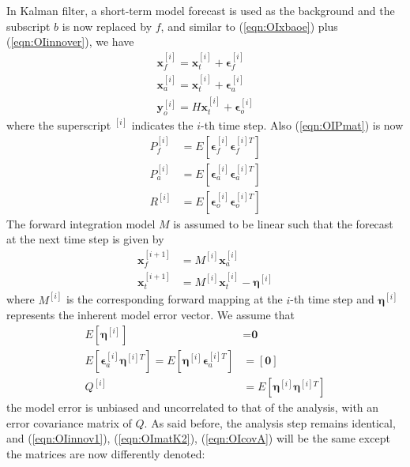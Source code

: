 In Kalman filter, a short-term model forecast is used as the background and the subscript $b$ is now replaced by $f$, and similar to (\ref{eqn:OIxbaoe}) plus (\ref{eqn:OIinnover}), we have
\begin{subequations}
\begin{align}
\textbf{x}_f^{[i]} = \textbf{x}_t^{[i]} + \bm{\epsilon}_f^{[i]} \\
\textbf{x}_a^{[i]} = \textbf{x}_t^{[i]} + \bm{\epsilon}_a^{[i]} \\
\textbf{y}_o^{[i]} = H\textbf{x}_t^{[i]} + \bm{\epsilon}_o^{[i]}    
\end{align}    
\end{subequations}
where the superscript $^{[i]}$ indicates the $i$-th time step. Also (\ref{eqn:OIPmat}) is now
\begin{subequations}
\begin{align}
P_f^{[i]} &= E[\bm{\epsilon}_f^{[i]}\bm{\epsilon}_f^{[i]T}] \\
P_a^{[i]} &= E[\bm{\epsilon}_a^{[i]}\bm{\epsilon}_a^{[i]T}] \\
R^{[i]} &= E[\bm{\epsilon}_o^{[i]}\bm{\epsilon}_o^{[i]T}]    
\end{align}
\end{subequations}
The forward integration model $M$ is assumed to be linear such that the forecast at the next time step is given by
\begin{subequations}
\label{eqn:forecastKalman}
\begin{align}
\textbf{x}_f^{[i+1]} &= M^{[i]}\textbf{x}_a^{[i]} \label{eqn:xaMxf} \\
\textbf{x}_t^{[i+1]} &= M^{[i]}\textbf{x}_t^{[i]} - \bm{\eta}^{[i]}
\end{align}
\end{subequations}
where $M^{[i]}$ is the corresponding forward mapping at the $i$-th time step and $\bm{\eta}^{[i]}$ represents the inherent model error vector. We assume that
\begin{subequations}
\begin{align}
E[\bm{\eta}^{[i]}] &= \textbf{0} \\
E[\bm{\epsilon}_a^{[i]}\bm{\eta}^{[i]T}] = E[\bm{\eta}^{[i]}\bm{\epsilon}_a^{[i]T}] &= [\textbf{0}] \label{eqn:modelanluncorr}\\
Q^{[i]} &= E[\bm{\eta}^{[i]}\bm{\eta}^{[i]T}]
\end{align}   
\end{subequations}
the model error is unbiased and uncorrelated to that of the analysis, with an error covariance matrix of $Q$. As said before, the analysis step remains identical, and (\ref{eqn:OIinnov1}), (\ref{eqn:OImatK2}), (\ref{eqn:OIcovA}) will be the same except the matrices are now differently denoted:
